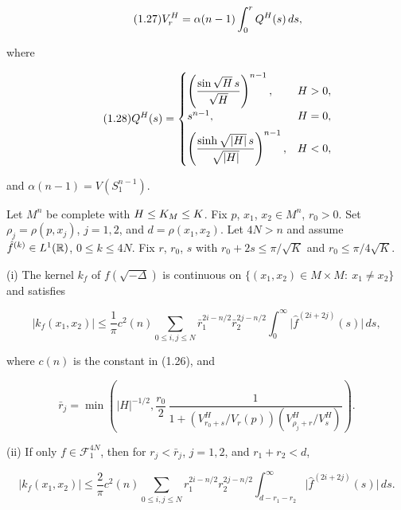 \begin{equation}\tag{1.27}
V_r^{H} = \alpha(n-1)\int_0^r Q^{H}(s)\,ds,
\end{equation}

where

\begin{equation}\tag{1.28}
Q^{H}(s)=
\begin{cases}
\left(\dfrac{\sin \sqrt{H}\,s}{\sqrt{H}}\right)^{n-1}, & H>0,\\[1.2ex]
s^{n-1}, & H=0,\\[1.2ex]
\left(\dfrac{\sinh \sqrt{|H|}\,s}{\sqrt{|H|}}\right)^{n-1}, & H<0,
\end{cases}
\end{equation}

and $\alpha(n-1)=V(S^{n-1}_1)$.

\begin{theorem}
\label{thm:kernel-estimates-bounded-curvature}

Let $M^n$ be complete with $H \leq K_M \leq K$. Fix $p$, $x_1$, $x_2 \in M^n$,
$r_0 > 0$. Set $\rho_j = \rho(p,x_j)$, $j=1,2$, and $d = \rho(x_1,x_2)$.
Let $4N > n$ and assume $\hat f^{(k)} \in L^1(\mathbb{R})$, $0 \le k \le 4N$.
Fix $r$, $r_0$, $s$ with $r_0 + 2s \leq \pi/\sqrt{K}$ and $r_0 \leq \pi/4\sqrt{K}$.

\textup{(i)} The kernel $k_f$ of $f(\sqrt{-\Delta})$ is continuous on
$\{(x_1,x_2) \in M \times M:\ x_1 \ne x_2\}$ and satisfies

\begin{equation}\tag{1.29}
|k_f(x_1,x_2)| \leq \frac{1}{\pi} c^2(n) \sum_{0 \le i,j \le N}
\bar r_1^{2i-n/2}\bar r_2^{2j-n/2} \int_0^\infty \bigl|\hat f^{(2i+2j)}(s)\bigr|\,ds,
\end{equation}

where $c(n)$ is the constant in (1.26), and

\begin{equation}\tag{1.30}
\bar r_j = \min\!\left(|H|^{-1/2}, \frac{r_0}{2}\,\frac{1}{1 + \left(V^{H}_{r_0+s}/V_r(p)\right)\left(V^{H}_{\rho_j+r}/V^{H}_s\right)}\right).
\end{equation}

\textup{(ii)} If only $f \in \mathcal{F}^{4N}_1$, then for $r_j < \bar r_j$, $j=1,2$,
and $r_1 + r_2 < d$,

\begin{equation}\tag{1.31}
|k_f(x_1,x_2)| \leq \frac{2}{\pi} c^2(n) \sum_{0 \le i,j \le N}
r_1^{2i-n/2}r_2^{2j-n/2} \int_{d-r_1-r_2}^\infty \bigl|\hat f^{(2i+2j)}(s)\bigr|\,ds.
\end{equation}
\end{theorem}

